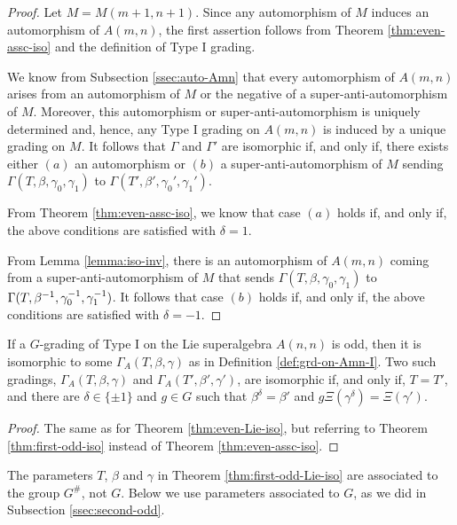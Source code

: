 \begin{proof}
	Let $M = M(m+1, n+1)$. Since any automorphism of $M$ induces an automorphism of $A(m,n)$, the first assertion follows from Theorem \ref{thm:even-assc-iso} and the definition of Type I grading.

	We know from Subsection \ref{ssec:auto-Amn} that every automorphism of $A(m, n)$ arises from an automorphism of $M$ or the negative of a super-anti-automorphism of $M$. Moreover, this automorphism or super-anti-automorphism is uniquely determined and, hence, any Type I grading on $A(m,n)$ is induced by a unique grading on $M$. It follows that $\Gamma$ and $\Gamma'$ are isomorphic if, and only if, there exists either $(a)$ an automorphism or $(b)$ a super-anti-automorphism of $M$ sending $\Gamma (T,\beta, \gamma_0, \gamma_1)$ to $\Gamma (T',\beta', \gamma_0', \gamma_1')$.

	From Theorem \ref{thm:even-assc-iso}, we know that case $(a)$ holds if, and only if, the above conditions are satisfied with $\delta = 1$.

	From Lemma \ref{lemma:iso-inv}, there is an automorphism of $A(m,n)$ coming from a super-anti-automorphism of $M$ that sends $\Gamma (T,\beta, \gamma_0, \gamma_1)$ to $\Gamma (T,\beta^{-1}, \gamma_0^{-1}, \gamma_1^{-1})$. It follows that case $(b)$ holds if, and only if, the above conditions are satisfied with $\delta = -1$.
\end{proof}

\begin{thm}\label{thm:first-odd-Lie-iso}
	If a $G$-grading of Type I on the Lie superalgebra $A(n,n)$ is odd, then it is isomorphic to some $\Gamma_A(T,\beta,\gamma)$ as in Definition \ref{def:grd-on-Amn-I}.
	Two such gradings, $\Gamma_A (T,\beta, \gamma)$ and $\Gamma_A (T',\beta', \gamma')$, are isomorphic if, and only if, $T=T'$, and there are $\delta \in \{\pm 1\}$ and $g\in G$ such that $\beta^\delta=\beta'$ and $g \Xi(\gamma^\delta)=\Xi(\gamma')$.
\end{thm}

\begin{proof}
	The same as for Theorem \ref{thm:even-Lie-iso}, but referring to Theorem \ref{thm:first-odd-iso} instead of Theorem \ref{thm:even-assc-iso}.
\end{proof}

The parameters $T$, $\beta$ and $\gamma$ in Theorem \ref{thm:first-odd-Lie-iso} are associated to the group $G^\#$, not $G$. Below we use parameters associated to $G$, as we did in Subsection \ref{ssec:second-odd}.

